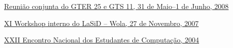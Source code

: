\documentclass[10pt]{article}
\renewcommand{\section}[1]{\pagebreak[3]%
    \vspace{1.3\baselineskip}%
    \phantomsection\addcontentsline{toc}{section}{#1}%
    \noindent\llap{\scshape\smash{\parbox[t]{\marginparwidth}{\hyphenpenalty=10000\raggedright #1}}}%
    \vspace{-\baselineskip}\par}
\newcommand{\halfblankline}{\quad\vspace{-0.5\baselineskip}\pagebreak[3]}
\begin{document}
\begin{innerlist}
    \item \href{https://gts.nic.br/reunioes/gts-11}{Reunião conjunta do GTER 25 e GTS 11, 31 de Maio--1 de Junho, 2008}

    \item \href{http://listas.dcc.ufba.br/pipermail/estudantes-comp/2007-November/003076.html}{XI Workshop interno do LaSiD -- Wola, 27 de Novembro, 2007}

    \item \href{http://wiki.enec.org.br/ENECOMP2004}{XXII Encontro Nacional dos Estudantes de Computação, 2004}

\end{innerlist}

\end{document}
